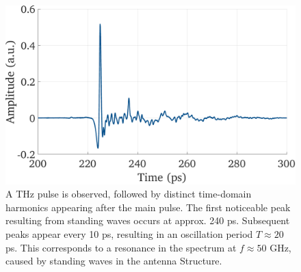 \begin{figure}[ht]
  \centering
    \centering
    \includegraphics[width=0.6\linewidth]{figures/ringing_schem.pdf}
    \caption{A THz pulse is observed, followed by distinct time-domain harmonics appearing after the main pulse. The first noticeable peak resulting from standing waves occurs at approx. \num{240} \si{\pico \s}. Subsequent peaks appear every \num{10} \si{\pico \s}, resulting in an oscillation period $T \approx 20$ \si{\pico \s}. This corresponds to a resonance in the spectrum at $f \approx 50$ \si{\giga \hertz}, caused by standing waves in the antenna Structure.} 
    \label{fig:ringing}
\end{figure}